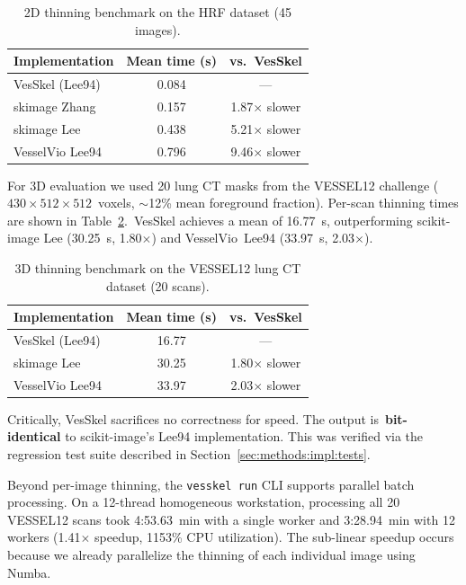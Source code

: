 \documentclass[11pt]{article}
\begin{document}
\begin{table}[htb]
  \centering
  \caption{2D thinning benchmark on the HRF dataset (45 images).}
  \label{tab:perf-2d}
  \small
  \begin{tabularx}{0.5\linewidth}{lcc}
    \toprule
    Implementation & Mean time (s) & vs.\ VesSkel \\
    \midrule
    VesSkel (Lee94)     & 0.084 & ---   \\
    skimage Zhang       & 0.157 & 1.87$\times$ slower \\
    skimage Lee         & 0.438 & 5.21$\times$ slower \\
    VesselVio Lee94     & 0.796 & 9.46$\times$ slower \\
    \bottomrule
  \end{tabularx}
\end{table}

For 3D evaluation we used 20 lung CT masks from the VESSEL12
challenge (~$430\times512\times512$~voxels, $\sim$12\% mean
foreground fraction). Per-scan thinning times are shown in
Table~\ref{tab:perf-3d}.~VesSkel achieves a mean of 16.77~s,
outperforming scikit-image Lee (30.25~s, 1.80$\times$) and
VesselVio~Lee94 (33.97~s, 2.03$\times$).

\begin{table}[htb]
  \centering
  \caption{3D thinning benchmark on the VESSEL12 lung CT dataset
  (20 scans).}
  \label{tab:perf-3d}
  \small
  \begin{tabularx}{0.5\linewidth}{lcc}
    \toprule
    Implementation & Mean time (s) & vs.\ VesSkel \\
    \midrule
    VesSkel (Lee94)   & 16.77 & ---   \\
    skimage Lee       & 30.25 & 1.80$\times$ slower \\
    VesselVio Lee94   & 33.97 & 2.03$\times$ slower \\
    \bottomrule
  \end{tabularx}
\end{table}

Critically, VesSkel sacrifices no correctness for speed. The output
is~\textbf{bit-identical} to scikit-image's Lee94 implementation.
This was verified via the regression test suite described in
Section~\ref{sec:methods:impl:tests}.

Beyond per-image thinning, the \texttt{vesskel run} CLI supports
parallel batch processing. On a 12-thread homogeneous workstation,
processing all 20 VESSEL12 scans took 4:53.63~min with a single
worker and 3:28.94~min with 12 workers (1.41$\times$ speedup, 1153\%
CPU utilization). The sub-linear speedup occurs because we already
parallelize the thinning of each individual image using Numba.
\end{document}
